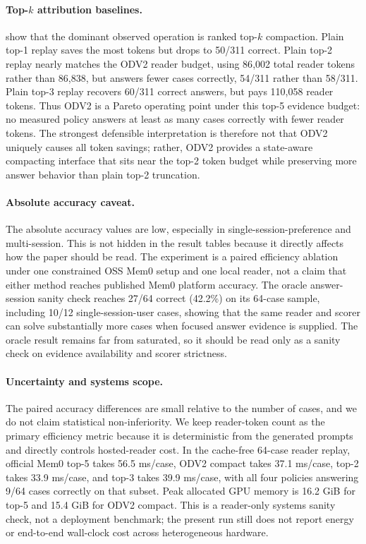 \documentclass{article}
\begin{document}
\paragraph{Top-$k$ attribution baselines.}
 show that the dominant observed operation is ranked top-$k$ compaction. Plain top-1 replay saves the most tokens but drops to 50/311 correct. Plain top-2 replay nearly matches the ODV2 reader budget, using 86{,}002 total reader tokens rather than 86{,}838, but answers fewer cases correctly, 54/311 rather than 58/311. Plain top-3 replay recovers 60/311 correct answers, but pays 110{,}058 reader tokens. Thus ODV2 is a Pareto operating point under this top-5 evidence budget: no measured policy answers at least as many cases correctly with fewer reader tokens. The strongest defensible interpretation is therefore not that ODV2 uniquely causes all token savings; rather, ODV2 provides a state-aware compacting interface that sits near the top-2 token budget while preserving more answer behavior than plain top-2 truncation.

\paragraph{Absolute accuracy caveat.}
The absolute accuracy values are low, especially in single-session-preference and multi-session. This is not hidden in the result tables because it directly affects how the paper should be read. The experiment is a paired efficiency ablation under one constrained OSS Mem0 setup and one local reader, not a claim that either method reaches published Mem0 platform accuracy. The oracle answer-session sanity check reaches 27/64 correct (42.2\%) on its 64-case sample, including 10/12 single-session-user cases, showing that the same reader and scorer can solve substantially more cases when focused answer evidence is supplied. The oracle result remains far from saturated, so it should be read only as a sanity check on evidence availability and scorer strictness.

\paragraph{Uncertainty and systems scope.}
The paired accuracy differences are small relative to the number of cases, and we do not claim statistical non-inferiority. We keep reader-token count as the primary efficiency metric because it is deterministic from the generated prompts and directly controls hosted-reader cost. In the cache-free 64-case reader replay, official Mem0 top-5 takes 56.5 ms/case, ODV2 compact takes 37.1 ms/case, top-2 takes 33.9 ms/case, and top-3 takes 39.9 ms/case, with all four policies answering 9/64 cases correctly on that subset. Peak allocated GPU memory is 16.2 GiB for top-5 and 15.4 GiB for ODV2 compact. This is a reader-only systems sanity check, not a deployment benchmark; the present run still does not report energy or end-to-end wall-clock cost across heterogeneous hardware.
\end{document}
